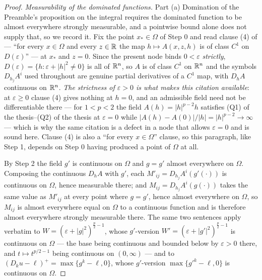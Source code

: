 \begin{proof}
\emph{Measurability of the dominated functions.}  Part (a) Domination of the
Preamble's proposition on the integral requires the dominated function to be
almost everywhere strongly measurable, and a pointwise bound alone does not
supply that, so we record it.  Fix the point $x_\ast\in\Omega$ of Step 0 and read
clause (4) of  --- ``for every $x\in\Omega$ and
every $z\in\mathbb{R}$ the map $h\mapsto A(x,z,h)$ is of class $C^1$ on
$D(\varepsilon)$'' --- at $x_\ast$ and $z=0$.  Since the present node binds
$0<\varepsilon$ \emph{strictly}, $D(\varepsilon)=\{h:\varepsilon+|h|^2\ne0\}$ is
all of $\mathbb{R}^n$, so $A$ is of class $C^1$ on $\mathbb{R}^n$ and the symbols
$D_{h_j}A^i$ used throughout are genuine partial derivatives of a $C^1$ map,
with $D_hA$ continuous on $\mathbb{R}^n$.  \emph{The strictness of $\varepsilon>0$ is
what makes this citation available}: at $\varepsilon\ge0$ clause (4) gives
nothing at $h=0$, and an admissible field need not be differentiable there --- for
$1<p<2$ the field $A(h)=|h|^{p-2}h$ satisfies
(Q1) of the thesis--(Q2) of the thesis at $\varepsilon=0$ while
$|A(h)-A(0)|/|h|=|h|^{p-2}\to\infty$ --- which is why the same citation is a
defect in a node that allows $\varepsilon=0$ and is sound here.  Clause (4) is
also a ``for every $x\in\Omega$'' clause, so this paragraph, like Step 1,
depends on Step 0 having produced a point of $\Omega$ at all.

By Step 2 the field $g'$ is continuous on $\Omega$ and $g=g'$ almost everywhere
on $\Omega$.  Composing the continuous $D_hA$ with $g'$, each
$M'_{ij}=D_{h_j}A^i(g'(\cdot))$ is continuous on $\Omega$, hence measurable
there; and $M_{ij}=D_{h_j}A^i(g(\cdot))$ takes the same value as $M'_{ij}$ at
every point where $g=g'$, hence almost everywhere on $\Omega$, so $M_{ij}$ is
almost everywhere equal on $\Omega$ to a continuous function and is therefore
almost everywhere strongly measurable there.  The same two sentences apply
verbatim to $W=(\varepsilon+|g|^2)^{\frac p2-1}$, whose $g'$-version
$W'=(\varepsilon+|g'|^2)^{\frac p2-1}$ is continuous on $\Omega$ --- the base
being continuous and bounded below by $\varepsilon>0$ there, and
$t\mapsto t^{p/2-1}$ being continuous on $(0,\infty)$ --- and to
$(D_ku-\ell)^{+}=\max\{g^k-\ell,0\}$, whose $g'$-version
$\max\{g'^k-\ell,0\}$ is continuous on $\Omega$.


\end{proof}
